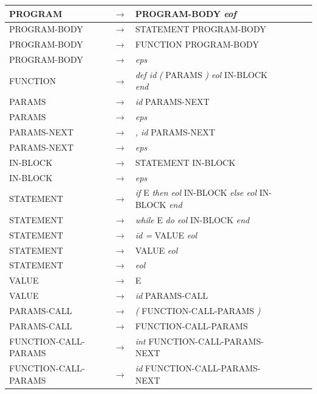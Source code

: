 \documentclass[12pt, a4paper]{article}
\begin{document}
\begin{table}[ht] 
	\begin{center}
	\begin{tabular}{| l c l | l c l |} 
	\hline	 
	PROGRAM & $\longrightarrow$ & PROGRAM-BODY \emph{eof} \\
	\hline
	PROGRAM-BODY & $\longrightarrow$ & STATEMENT PROGRAM-BODY \\
	PROGRAM-BODY & $\longrightarrow$ & FUNCTION PROGRAM-BODY \\
	PROGRAM-BODY & $\longrightarrow$ & \emph{eps} \\
	\hline
	FUNCTION & $\longrightarrow$ & \emph{def id} \emph{(} PARAMS \emph{)} \emph{eol} IN-BLOCK \emph{end}\\ 
	\hline
	PARAMS & $\longrightarrow$ & \emph{id} PARAMS-NEXT\\
	PARAMS & $\longrightarrow$ &  \emph{eps} \\
	\hline
	PARAMS-NEXT & $\longrightarrow$ & \emph{, id} PARAMS-NEXT \\
	PARAMS-NEXT & $\longrightarrow$ & \emph{eps} \\
	\hline
	IN-BLOCK & $\longrightarrow$ & STATEMENT IN-BLOCK \\
	IN-BLOCK & $\longrightarrow$ & \emph{eps} \\
	\hline
	STATEMENT & $\longrightarrow$ & \emph{if} E \emph{then eol} IN-BLOCK\emph{ else eol} 		IN-BLOCK \emph{end} \\
	STATEMENT & $\longrightarrow$ & \emph{while} E \emph{do eol} IN-BLOCK \emph{end} \\
	STATEMENT & $\longrightarrow$ & \emph{id =} VALUE \emph{eol} \\
	STATEMENT & $\longrightarrow$ & VALUE \emph{eol} \\
	STATEMENT & $\longrightarrow$ & \emph{eol} \\
	\hline
	VALUE & $\longrightarrow$ & E \\
	VALUE & $\longrightarrow$ & \emph{id} PARAMS-CALL \\
	\hline
	PARAMS-CALL & $\longrightarrow$ & \emph{(} FUNCTION-CALL-PARAMS \emph{)}\\
	PARAMS-CALL & $\longrightarrow$ & FUNCTION-CALL-PARAMS \\
	\hline
	FUNCTION-CALL-PARAMS & $\longrightarrow$ & \emph{int} FUNCTION-CALL-PARAMS-NEXT \\
	FUNCTION-CALL-PARAMS & $\longrightarrow$ & \emph{id} FUNCTION-CALL-PARAMS-NEXT \\

\end{tabular}
\end{center}
\end{table}
\end{document}
